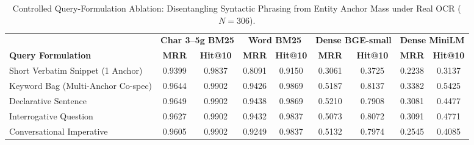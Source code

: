 \begin{table}[t]
\centering
\caption{Controlled Query-Formulation Ablation: Disentangling Syntactic Phrasing from Entity Anchor Mass under Real OCR ($N=306$).}
\label{tab:query_formulation_controlled}
\small
\begin{tabular}{lcccccccc}
\toprule
& \multicolumn{2}{c}{\textbf{Char 3--5g BM25}} & \multicolumn{2}{c}{\textbf{Word BM25}} & \multicolumn{2}{c}{\textbf{Dense BGE-small}} & \multicolumn{2}{c}{\textbf{Dense MiniLM}} \\
\cmidrule(lr){2-3}\cmidrule(lr){4-5}\cmidrule(lr){6-7}\cmidrule(lr){8-9}
\textbf{Query Formulation} & \textbf{MRR} & \textbf{Hit@10} & \textbf{MRR} & \textbf{Hit@10} & \textbf{MRR} & \textbf{Hit@10} & \textbf{MRR} & \textbf{Hit@10} \\
\midrule
Short Verbatim Snippet (1 Anchor) & 0.9399 & 0.9837 & 0.8091 & 0.9150 & 0.3061 & 0.3725 & 0.2238 & 0.3137 \\
Keyword Bag (Multi-Anchor Co-spec) & 0.9644 & 0.9902 & 0.9426 & 0.9869 & 0.5187 & 0.8137 & 0.3382 & 0.5425 \\
Declarative Sentence & 0.9649 & 0.9902 & 0.9438 & 0.9869 & 0.5210 & 0.7908 & 0.3081 & 0.4477 \\
Interrogative Question & 0.9627 & 0.9902 & 0.9432 & 0.9837 & 0.5073 & 0.8072 & 0.3091 & 0.4771 \\
Conversational Imperative & 0.9605 & 0.9902 & 0.9249 & 0.9837 & 0.5132 & 0.7974 & 0.2545 & 0.4085 \\
\bottomrule
\end{tabular}
\end{table}
